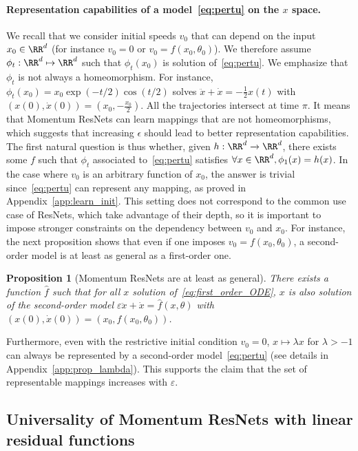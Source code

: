 \documentclass{article}
\newtheorem{proposition}{Proposition}
\begin{document}
\paragraph{Representation capabilities of a model~\eqref{eq:pertu} on the $x$ space.}
We recall that we consider initial speeds $v_0$ that can depend on the input $x_0 \in \RR^d$ (for instance $v_0 = 0$ or $v_0 = f(x_0,\theta_0)$). We therefore assume $\phi_t :\RR^d \mapsto  \RR^d$ such that $\phi_t(x_0)$ is solution of~\eqref{eq:pertu}. We emphasize that $\phi_t$ is not always a homeomorphism. For instance, 
$\phi_t(x_0) = x_0\exp{(-t/2)}\cos{(t/2)}$
solves
$   \ddot{x}  + \dot{x} =  - \frac{1}{2} x(t) $ with $
    (x(0),\dot{x}(0)) = (x_0, -\frac{x_0}{2})$. All the trajectories intersect at time $\pi$. It means that Momentum ResNets can learn mappings that are not homeomorphisms, which suggests that increasing $\epsilon$ should lead to better representation capabilities. The first natural question is thus whether, given $h : \RR^d \xrightarrow{} \RR^d$, there exists some $f$ such that $\phi_t$ associated to~\eqref{eq:pertu} satisfies $
\forall x \in \RR^d, \phi_1(x) = h(x)$.
In the case where $v_0$ is an arbitrary function of $x_0$, the answer is trivial since~\eqref{eq:pertu} can represent any mapping, as proved in Appendix~\ref{app:learn_init}.
This setting does not correspond to the common use case of ResNets, which take advantage of their depth, so it is important to impose stronger constraints on the dependency between $v_0$ and $x_0$.  
For instance, the next proposition shows that even if one imposes $v_0 = f(x_0,\theta_0)$, a second-order model is at least as general as a first-order one.

\begin{proposition}[Momentum ResNets are at least as general]\label{prop:bigger_set}
There exists a function $\hat{f}$ such that for all $x$ solution of~\eqref{eq:first_order_ODE}, $x$ is also solution of the second-order model
$\varepsilon \ddot{x} + \dot{x} = \hat{f}(x,\theta)$
with 
$(x(0),\dot{x}(0)) = (x_0,f(x_0,\theta_0))$.
\end{proposition}

Furthermore, even with the restrictive initial condition $v_0=0$, $x \mapsto \lambda x$ for $\lambda > -1$ can always be represented by a second-order model~\eqref{eq:pertu}
(see details in Appendix~\ref{app:prop_lambda}).
This supports the claim that the set of representable mappings increases with $\varepsilon$. 

\subsection{Universality of Momentum ResNets with linear residual functions}
\end{document}
